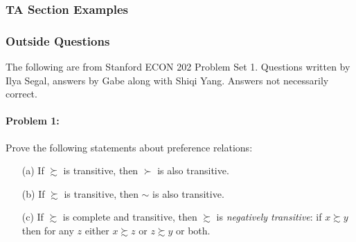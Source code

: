 \documentclass[12pt]{article}
\begin{document}
\subsubsection{TA Section Examples}

\subsubsection{Outside Questions}

The following are from Stanford ECON 202 Problem Set 1. Questions written by Ilya Segal, answers by Gabe along with Shiqi Yang. Answers not necessarily correct.


\paragraph{Problem 1:} Prove the following statements about preference relations:

\begin{itemize}
    \item[(a)] If $\succsim$ is transitive, then $\succ$ is also transitive.

    \item[(b)] If $\succsim$ is transitive, then $\sim$ is also transitive.

    \item[(c)] If $\succsim$ is complete and transitive, then $\succsim$ is \emph{negatively transitive}: if $x \succsim y$ then for any $z$ either $x \succsim z$ or $z \succsim y$ or both.
\end{itemize}

\medskip
\end{document}
